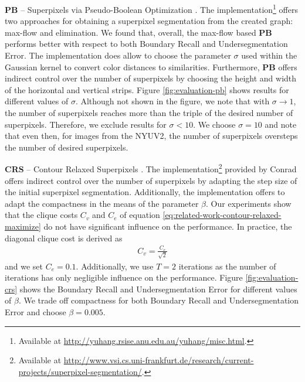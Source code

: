\textbf{PB} -- Superpixels via Pseudo-Boolean Optimization \cite{ZhangHartleyMashfordBurn:2011}. The implementation\footnote{Available at \url{http://yuhang.rsise.anu.edu.au/yuhang/misc.html}.} offers two approaches for obtaining a superpixel segmentation from the created graph: max-flow and elimination. We found that, overall, the max-flow based \textbf{PB} performs better with respect to both Boundary Recall and Undersegmentation Error. The implementation does allow to choose the parameter $\sigma$ used within the Gaussian kernel to convert color distances to similarities. Furthermore, \textbf{PB} offers indirect control over the number of superpixels by choosing the height and width of the horizontal and vertical strips. Figure \ref{fig:evaluation-pb} shows results for different values of $\sigma$. Although not shown in the figure, we note that with $\sigma \rightarrow 1$, the number of superpixels reaches more than the triple of the desired number of superpixels. Therefore, we exclude results for $\sigma < 10$. We choose $\sigma = 10$ and note that even then, for images from the NYUV2, the number of superpixels oversteps the number of desired superpixels.

\textbf{CRS} -- Contour Relaxed Superpixels \cite{ConradMertzMester:2013}. The implementation\footnote{Available at \url{http://www.vsi.cs.uni-frankfurt.de/research/current-projects/superpixel-segmentation/}.} provided by Conrad \etal offers indirect control over the number of superpixels by adapting the step size of the initial superpixel segmentation. Additionally, the implementation offers to adapt the compactness in the means of the parameter $\beta$. Our experiments show that the clique costs $C_{v}$ and $C_e$ of equation \eqref{eq:related-work-contour-relaxed-maximize} do not have significant influence on the performance. In practice, the diagonal clique cost is derived as
\begin{align}
	C_{v} = \frac{C_{e}}{\sqrt{2}}
\end{align}
and we set $C_{e} = 0.1$. Additionally, we use $T = 2$ iterations as the number of iterations has only negligible influence on the performance. Figure \ref{fig:evaluation-crs} shows the Boundary Recall and Undersegmentation Error for different values of $\beta$. We trade off compactness for both Boundary Recall and Undersegmentation Error and choose $\beta = 0.005$.

